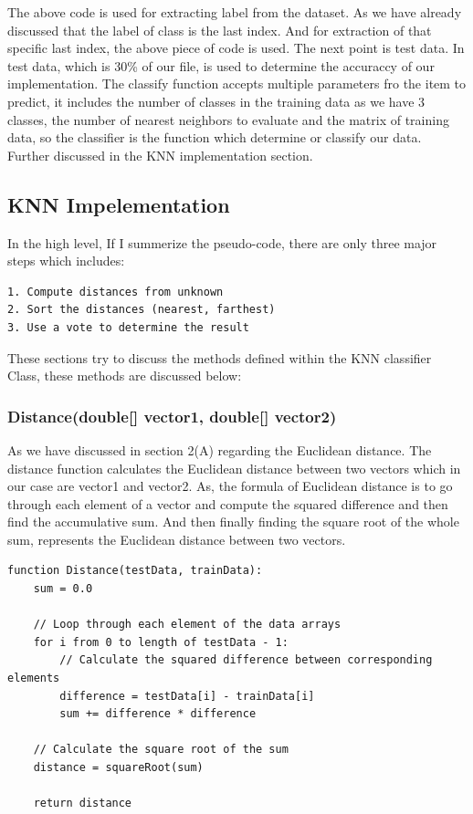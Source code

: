 \documentclass[conference]{IEEEtran}
\begin{document}
The above code is used for extracting label from the dataset. As we have already discussed that the label of class is the last index. And for extraction of that specific last index, the above piece of code is used. The next point is test data. In test data, which is 30\% of our file, is used to determine the accuraccy of our implementation. The classify function accepts multiple parameters fro the item to predict, it includes the number of classes in the training data as we have 3 classes, the number of nearest neighbors to evaluate and the matrix of training data, so the classifier is the function which determine or classify our data. Further discussed in the KNN implementation section. 





\subsection{KNN Impelementation}
In the high level, If I summerize the pseudo-code, there are only three major steps which includes:
\begin{lstlisting}
1. Compute distances from unknown
2. Sort the distances (nearest, farthest)
3. Use a vote to determine the result
\end{lstlisting}

These sections try to discuss the methods defined within the KNN classifier Class, these methods are discussed below:

\subsubsection{Distance(double[] vector1, double[] vector2)}
As we have discussed in section 2(A) regarding the Euclidean distance. The distance function calculates the Euclidean distance between two vectors which in our case are vector1 and vector2. As, the formula of Euclidean distance is to go through each element of a vector and compute the squared difference and then find the accumulative sum. And then finally finding the square root of the whole sum, represents the Euclidean distance between two vectors. 

\begin{lstlisting}
function Distance(testData, trainData):
    sum = 0.0
    
    // Loop through each element of the data arrays
    for i from 0 to length of testData - 1:
        // Calculate the squared difference between corresponding elements
        difference = testData[i] - trainData[i]
        sum += difference * difference
    
    // Calculate the square root of the sum
    distance = squareRoot(sum)
    
    return distance
\end{lstlisting}
\end{document}
